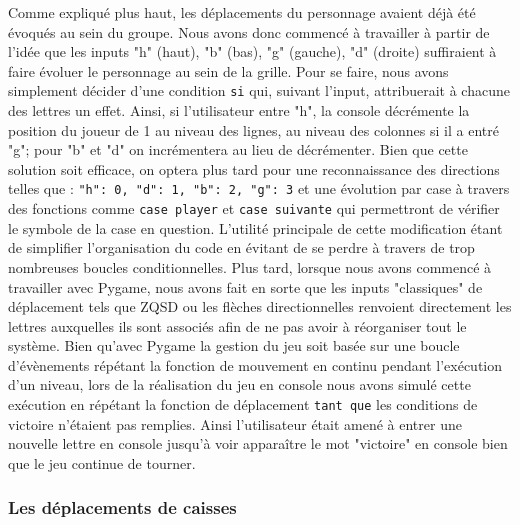 \documentclass[a4paper,12pt]{article} %
\begin{document}
Comme expliqué plus haut, les déplacements du personnage avaient déjà été évoqués au sein du groupe. Nous avons donc commencé à travailler à partir de l'idée que les inputs "h" (haut), "b" (bas), "g" (gauche), "d" (droite) suffiraient à faire évoluer le personnage au sein de la grille. Pour se faire, nous avons simplement décider d'une condition \texttt{si} qui, suivant l'input, attribuerait à chacune des lettres un effet. Ainsi, si l'utilisateur entre "h", la console décrémente la position du joueur de 1 au niveau des lignes, au niveau des colonnes si il a entré "g"; pour "b" et "d" on incrémentera au lieu de décrémenter. Bien que cette solution soit efficace, on optera plus tard pour une reconnaissance des directions telles que : \texttt{"h": 0, "d": 1, "b": 2, "g": 3} et une évolution par case à travers des fonctions comme \texttt{case player} et \texttt{case suivante} qui permettront de vérifier le symbole de la case en question. L'utilité principale de cette modification étant de simplifier l'organisation du code en évitant de se perdre à travers de trop nombreuses boucles conditionnelles. Plus tard, lorsque nous avons commencé à travailler avec Pygame, nous avons fait en sorte que les inputs "classiques" de déplacement tels que ZQSD ou les flèches directionnelles renvoient directement les lettres auxquelles ils sont associés afin de ne pas avoir à réorganiser tout le système.
\newline
Bien qu'avec Pygame la gestion du jeu soit basée sur une boucle d’évènements répétant la fonction de mouvement en continu pendant l’exécution d'un niveau, lors de la réalisation du jeu en console nous avons simulé cette exécution en répétant la fonction de déplacement \texttt{tant que} les conditions de victoire n'étaient pas remplies. Ainsi l'utilisateur était amené à entrer une nouvelle lettre en console jusqu'à voir apparaître le mot "victoire" en console bien que le jeu continue de tourner.

\subsubsection{Les déplacements de caisses}
\end{document}

